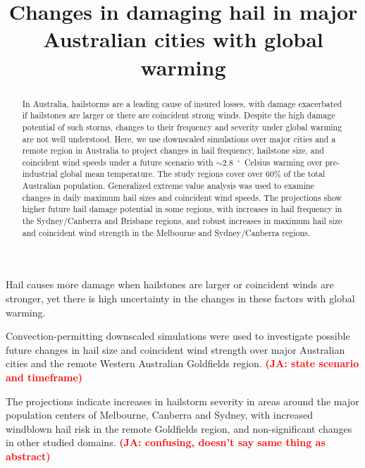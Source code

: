 \documentclass[]{agujournal2019}\usepackage[]{graphicx}\usepackage[]{xcolor}
\newcommand*{\todo}[1]{\textbf{\textcolor{red}{(#1)}}}
\begin{document}
\title{Changes in damaging hail in major Australian cities with global warming}




\begin{keypoints}
\item Hail causes more damage when hailstones are larger or coincident winds are
stronger, yet there is high uncertainty in the changes in these factors with
global warming.
\item Convection-permitting downscaled simulations were used to investigate
possible future changes in hail size and coincident wind strength over major
Australian cities and the remote Western Australian Goldfields region. \todo{JA:
state scenario and timeframe}
\item The projections indicate increases in hailstorm severity in areas around
the major population centers of Melbourne, Canberra and Sydney, with increased
windblown hail risk in the remote Goldfields region, and non-significant changes
in other studied domains. \todo{JA: confusing, doesn't say same thing as abstract}
\end{keypoints}

\begin{abstract} %
      In Australia, hailstorms are a leading cause of insured losses, with
      damage exacerbated if hailstones are larger or there are coincident strong
      winds. Despite the high damage potential of such storms, changes to their
      frequency and severity under global warming are not well understood. Here,
      we use downscaled simulations over major cities and a remote region in
      Australia to project changes in hail frequency, hailstone size, and
      coincident wind speeds under a future scenario with
      $\sim$2.8~$^{\circ{}}$~Celsius warming over pre-industrial global mean
      temperature. The study regions cover over 60\% of the total Australian
      population. Generalized extreme value analysis was used to examine changes
      in daily maximum hail sizes and coincident wind speeds. The projections
      show higher future hail damage potential in some regions, with increases
      in hail frequency in the Sydney/Canberra and Brisbane regions, and robust
      increases in maximum hail size and coincident wind strength in the
      Melbourne and Sydney/Canberra regions.
\end{abstract}
\end{document}
